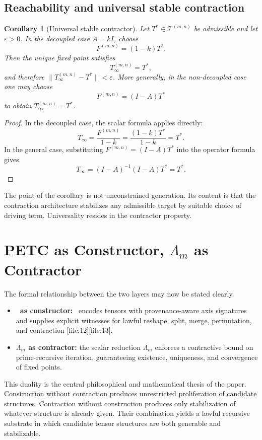 \documentclass[11pt,a4paper]{article}
\newtheorem{corollary}[theorem]{Corollary}
\newcommand{\Tensor}{\mathcal{T}}
\newcommand{\PETC}{\mathrm{PETC}}
\newcommand{\Id}{I}
\begin{document}
\subsection{Reachability and universal stable contraction}

\begin{corollary}[Universal stable contractor]
Let \(T^* \in \Tensor^{(m,n)}\) be admissible and let \(\varepsilon>0\). In the decoupled case \(A=k\Id\), choose
\[
F^{(m,n)}=(1-k)T^*.
\]
Then the unique fixed point satisfies
\[
T_\infty^{(m,n)}=T^*,
\]
and therefore \(\|T_\infty^{(m,n)}-T^*\|<\varepsilon\). More generally, in the non-decoupled case one may choose
\[
F^{(m,n)}=(\Id-A)T^*
\]
to obtain \(T_\infty^{(m,n)}=T^*\).
\end{corollary}

\begin{proof}
In the decoupled case, the scalar formula applies directly:
\[
T_\infty = \frac{F^{(m,n)}}{1-k} = \frac{(1-k)T^*}{1-k}=T^*.
\]
In the general case, substituting \(F^{(m,n)}=(\Id-A)T^*\) into the operator formula gives
\[
T_\infty=(\Id-A)^{-1}(\Id-A)T^* = T^*.
\]
\end{proof}

The point of the corollary is not unconstrained generation. Its content is that the contraction architecture stabilizes any admissible target by suitable choice of driving term. Universality resides in the contractor property.

\section{PETC as Constructor, \(\Lambda_m\) as Contractor}

The formal relationship between the two layers may now be stated clearly.

\begin{itemize}[leftmargin=2em]
\item \textbf{\PETC\ as constructor:} \PETC\ encodes tensors with provenance-aware axis signatures and supplies explicit witnesses for lawful reshape, split, merge, permutation, and contraction [file:12][file:13].
\item \textbf{\(\Lambda_m\) as contractor:} the scalar reduction \(\Lambda_m\) enforces a contractive bound on prime-recursive iteration, guaranteeing existence, uniqueness, and convergence of fixed points.
\end{itemize}

This duality is the central philosophical and mathematical thesis of the paper. Construction without contraction produces unrestricted proliferation of candidate structures. Contraction without construction produces only stabilization of whatever structure is already given. Their combination yields a lawful recursive substrate in which candidate tensor structures are both generable and stabilizable.
\end{document}
